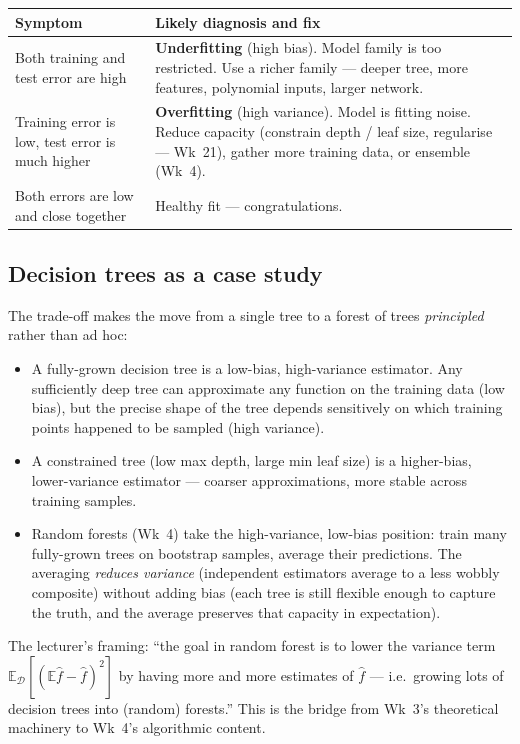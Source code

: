 \documentclass[11pt, a4paper]{article}
\newcommand{\thead}[1]{\textbf{#1}}
\begin{document}
\begin{center}
\renewcommand{\arraystretch}{1.3}
\begin{tabularx}{\linewidth}{l X}
\toprule
\thead{Symptom} & \thead{Likely diagnosis and fix} \\
\midrule
Both training and test error are high & \textbf{Underfitting} (high bias). Model family is too restricted. Use a richer family — deeper tree, more features, polynomial inputs, larger network. \\
Training error is low, test error is much higher & \textbf{Overfitting} (high variance). Model is fitting noise. Reduce capacity (constrain depth / leaf size, regularise — Wk~21), gather more training data, or ensemble (Wk~4). \\
Both errors are low and close together & Healthy fit — congratulations. \\
\bottomrule
\end{tabularx}
\end{center}

\subsection{Decision trees as a case study}

The trade-off makes the move from a single tree to a forest of trees \emph{principled} rather than ad hoc:

\begin{itemize}
  \item A fully-grown decision tree is a low-bias, high-variance estimator. Any sufficiently deep tree can approximate any function on the training data (low bias), but the precise shape of the tree depends sensitively on which training points happened to be sampled (high variance).
  \item A constrained tree (low max depth, large min leaf size) is a higher-bias, lower-variance estimator — coarser approximations, more stable across training samples.
  \item Random forests (Wk~4) take the high-variance, low-bias position: train many fully-grown trees on bootstrap samples, average their predictions. The averaging \emph{reduces variance} (independent estimators average to a less wobbly composite) without adding bias (each tree is still flexible enough to capture the truth, and the average preserves that capacity in expectation).
\end{itemize}

The lecturer's framing: ``the goal in random forest is to lower the variance term $\mathbb{E}_{\mathcal{D}}[(\mathbb{E}\hat f - \hat f)^2]$ by having more and more estimates of $\hat{f}$ — i.e.\ growing lots of decision trees into (random) forests.'' This is the bridge from Wk~3's theoretical machinery to Wk~4's algorithmic content.
\end{document}
